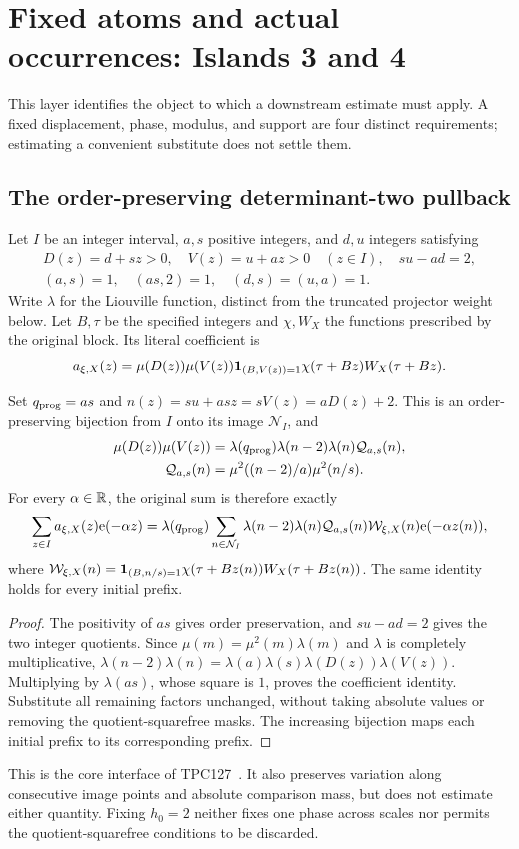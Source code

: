 \section{Fixed atoms and actual occurrences: Islands 3 and 4}\label{sec:structure}
This layer identifies the object to which a downstream estimate must apply. A fixed displacement, phase, modulus, and support are four distinct requirements; estimating a convenient substitute does not settle them.

\subsection{The order-preserving determinant-two pullback}
Let $I$ be an integer interval, $a,s$ positive integers, and $d,u$ integers satisfying
\[
\begin{gathered}
D(z)=d+sz>0,\quad V(z)=u+az>0\quad(z\in I),\quad su-ad=2,\\
(a,s)=1,\quad(as,2)=1,\quad(d,s)=(u,a)=1.
\end{gathered}
\]
Write $\lambda$ for the Liouville function, distinct from the truncated projector weight below. Let $B,\tau$ be the specified integers and $\chi,W_X$ the functions prescribed by the original block. Its literal coefficient is
\[
a_{\xi,X}(z)=\mu(D(z))\mu(V(z))\mathbf 1_{(B,V(z))=1}\chi(\tau+Bz)W_X(\tau+Bz).
\]
\begin{proposition}\label{prop:pullback}
Set $q_{\rm prog}=as$ and $n(z)=su+as z=sV(z)=aD(z)+2$. This is an order-preserving bijection from $I$ onto its image $\mathcal N_I$, and
\begin{align*}
\mu(D(z))\mu(V(z))&=\lambda(q_{\rm prog})\lambda(n-2)\lambda(n)\mathcal Q_{a,s}(n),\\
\mathcal Q_{a,s}(n)&=\mu^2((n-2)/a)\mu^2(n/s).
\end{align*}
For every $\alpha\in\mathbb R$, the original sum is therefore exactly
\[
\sum_{z\in I}a_{\xi,X}(z)\mathrm e(-\alpha z)
=\lambda(q_{\rm prog})\sum_{n\in\mathcal N_I}
\lambda(n-2)\lambda(n)\mathcal Q_{a,s}(n)\mathcal W_{\xi,X}(n)\mathrm e(-\alpha z(n)),
\]
where $\mathcal W_{\xi,X}(n)=\mathbf 1_{(B,n/s)=1}\chi(\tau+Bz(n))W_X(\tau+Bz(n))$. The same identity holds for every initial prefix.
\end{proposition}
\begin{proof}
The positivity of $as$ gives order preservation, and $su-ad=2$ gives the two integer quotients. Since $\mu(m)=\mu^2(m)\lambda(m)$ and $\lambda$ is completely multiplicative,
$\lambda(n-2)\lambda(n)=\lambda(a)\lambda(s)\lambda(D(z))\lambda(V(z))$.
Multiplying by $\lambda(as)$, whose square is $1$, proves the coefficient identity. Substitute all remaining factors unchanged, without taking absolute values or removing the quotient-squarefree masks. The increasing bijection maps each initial prefix to its corresponding prefix.
\end{proof}
This is the core interface of TPC127~\cite{archive127}. It also preserves variation along consecutive image points and absolute comparison mass, but does not estimate either quantity. Fixing $h_0=2$ neither fixes one phase across scales nor permits the quotient-squarefree conditions to be discarded.

